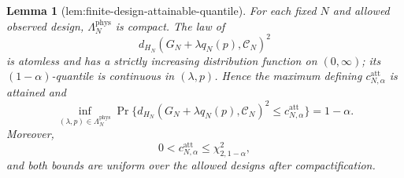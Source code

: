 \documentclass{article}
\newtheorem{lemma}{Lemma}
\begin{document}
\begin{lemma}[lem:finite-design-attainable-quantile]\label{lem:finite-design-attainable-quantile}
For each fixed \(N\) and allowed observed design, \(\Lambda_N^{\mathrm{phys}}\) is compact.  The law of
\[
 d_{H_N}(G_N+\lambda q_N(p),\mathcal C_N)^2
\]
is atomless and has a strictly increasing distribution function on \((0,\infty)\); its \((1-\alpha)\)-quantile is continuous in \((\lambda,p)\).  Hence the maximum defining \(c_{N,\alpha}^{\mathrm{att}}\) is attained and
\[
 \inf_{(\lambda,p)\in\Lambda_N^{\mathrm{phys}}}
 \Pr\{d_{H_N}(G_N+\lambda q_N(p),\mathcal C_N)^2
       \le c_{N,\alpha}^{\mathrm{att}}\}=1-\alpha.                           \tag{20}
\]
Moreover,
\[
 0<c_{N,\alpha}^{\mathrm{att}}\le\chi^2_{2,1-\alpha},                       \tag{21}
\]
and both bounds are uniform over the allowed designs after compactification.
\end{lemma}
\end{document}
